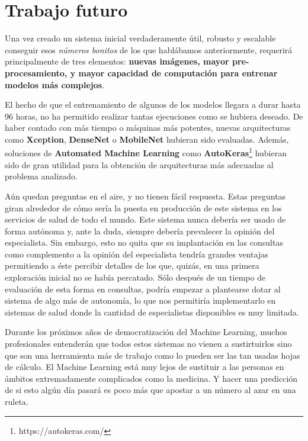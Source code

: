\documentclass[
  12pt,
  spanish,
  a4paperpaper,
]{report}
\begin{document}
\hypertarget{trabajo-futuro}{%
\section{Trabajo futuro}\label{trabajo-futuro}}

Una vez creado un sistema inicial verdaderamente útil, robusto y
escalable conseguir esos \emph{números bonitos} de los que hablábamos
anteriormente, requerirá principalmente de tres elementos:
\textbf{nuevas imágenes, mayor pre-procesamiento, y mayor capacidad de
computación para entrenar modelos más complejos}.

El hecho de que el entrenamiento de algunos de los modelos llegara a
durar hasta 96 horas, no ha permitido realizar tantas ejecuciones como
se hubiera deseado. De haber contado con más tiempo o máquinas más
potentes, nuevas arquitecturas como \textbf{Xception}, \textbf{DenseNet}
o \textbf{MobileNet} hubieran sido evaluadas. Además, soluciones de
\textbf{Automated Machine Learning} como \textbf{AutoKeras}\footnote{https://autokeras.com/}
hubieran sido de gran utilidad para la obtención de arquitecturas más
adecuadas al problema analizado.

Aún quedan preguntas en el aire, y no tienen fácil respuesta. Estas
preguntas giran alrededor de cómo sería la puesta en producción de este
sistema en los servicios de salud de todo el mundo. Este sistema nunca
debería ser usado de forma autónoma y, ante la duda, siempre debería
prevalecer la opinión del especialista. Sin embargo, esto no quita que
su implantación en las consultas como complemento a la opinión del
especialista tendría grandes ventajas permitiendo a éste percibir
detalles de los que, quizás, en una primera exploración inicial no se
había percatado. Sólo después de un tiempo de evaluación de esta forma
en consultas, podría empezar a plantearse dotar al sistema de algo más
de autonomía, lo que nos permitiría implementarlo en sistemas de salud
donde la cantidad de especialistas disponibles es muy limitada.

Durante los próximos años de democratización del Machine Learning,
muchos profesionales entenderán que todos estos sistemas no vienen a
sustirtuirlos sino que son una herramienta más de trabajo como lo pueden
ser las tan usadas hojas de cálculo. El Machine Learning está muy lejos
de sustituir a las personas en ámbitos extremadamente complicados como
la medicina. Y hacer una predicción de si esto algún día pasará es poco
más que apostar a un número al azar en una ruleta.
\end{document}
